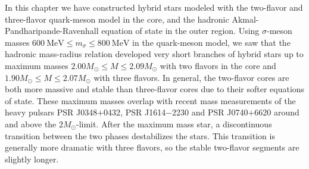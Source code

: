 In this chapter we have constructed hybrid stars modeled with the two-flavor and three-flavor quark-meson model in the core,
and the hadronic Akmal-Pandharipande-Ravenhall equation of state in the outer region.
Using $\sigma$-meson masses $\SI{600}{\mega\electronvolt} \leq m_\sigma \leq \SI{800}{\mega\electronvolt}$ in the quark-meson model,
we saw that the hadronic mass-radius relation developed very short branches of hybrid stars
up to maximum masses $2.00 M_\odot \leq M \leq 2.09 M_\odot$ with two flavors in the core
and $1.90 M_\odot \leq M \leq 2.07 M_\odot$ with three flavors.
In general, the two-flavor cores are both more massive and stable than three-flavor cores
due to their softer equations of state.
These maximum masses overlap with recent mass measurements of the heavy pulsars PSR J0348$+$0432, PSR J1614$-$2230 and PSR J0740$+$6620 around and above the $2 M_\odot$-limit.
After the maximum mass star, a discontinuous transition between the two phases destabilizes the stars.
This transition is generally more dramatic with three flavors,
so the stable two-flavor segments are slightly longer.
